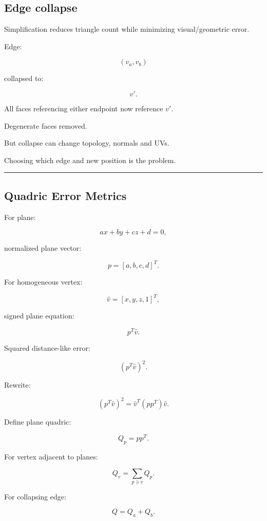 \subsection{Edge collapse}\label{04-visual-computing-ii-ch041-edge-collapse}

Simplification reduces triangle count while minimizing visual/geometric error.

Edge:

\[
(v_a,v_b)
\]

collapsed to:

\[
v'.
\]

All faces referencing either endpoint now reference \(v'\).

Degenerate faces removed.

But collapse can change topology, normals and UVs.

Choosing which edge and new position is the problem.

\begin{center}\rule{0.5\linewidth}{0.5pt}\end{center}

\subsection{Quadric Error Metrics}\label{04-visual-computing-ii-ch041-quadric-error-metrics}

For plane:

\[
ax+by+cz+d=0,
\]

normalized plane vector:

\[
p=
[a,b,c,d]^T.
\]

For homogeneous vertex:

\[
\hat v=
[x,y,z,1]^T,
\]

signed plane equation:

\[
p^T\hat v.
\]

Squared distance-like error:

\[
(p^T\hat v)^2.
\]

Rewrite:

\[
\boxed{
(p^T\hat v)^2
=
\hat v^T
(pp^T)
\hat v.
}
\]

Define plane quadric:

\[
Q_p=pp^T.
\]

For vertex adjacent to planes:

\[
\boxed{
Q_v=
\sum_{p\ni v}
Q_p.
}
\]

For collapsing edge:

\[
Q=
Q_a+Q_b.
\]

